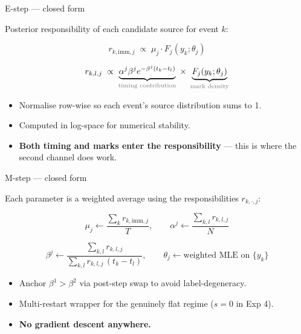 \documentclass[aspectratio=169,11pt]{beamer}
\begin{document}
\begin{frame}{E-step --- closed form}
  \vspace{0.6cm}

  Posterior responsibility of each candidate source for event $k$:

  \vspace{0.3cm}

  $$r_{k,\mathrm{imm},j} \;\propto\; \mu_j \cdot F_j(y_k;\theta_j)$$

  \vspace{0.2cm}

  $$r_{k,l,j} \;\propto\; \underbrace{\alpha^j\beta^j e^{-\beta^j(t_k - t_l)}}_{\textcolor{soft}{\text{timing contribution}}}
                          \;\times\; \underbrace{F_j(y_k;\theta_j)}_{\textcolor{soft}{\text{mark density}}}$$

  \vspace{0.5cm}

  \begin{itemize}
    \item Normalise row-wise so each event's source distribution sums to 1.
    \item Computed in log-space for numerical stability.
    \item \textbf{Both timing and marks enter the responsibility} --- this is where the second channel does work.
  \end{itemize}
\end{frame}

\begin{frame}{M-step --- closed form}
  \vspace{0.4cm}

  Each parameter is a weighted average using the responsibilities $r_{k,\cdot,j}$:

  \vspace{0.2cm}

  $$\mu_j \leftarrow \frac{\sum_k r_{k,\mathrm{imm},j}}{T}, \qquad
    \alpha^j \leftarrow \frac{\sum_{k,l} r_{k,l,j}}{N}$$

  $$\beta^j \leftarrow \frac{\sum_{k,l} r_{k,l,j}}{\sum_{k,l} r_{k,l,j}\,(t_k - t_l)}, \qquad
    \theta_j \leftarrow \text{weighted MLE on } \{y_k\}$$

  \vspace{0.5cm}

  \begin{itemize}
    \item Anchor $\beta^1 > \beta^2$ via post-step swap to avoid label-degeneracy.
    \item Multi-restart wrapper for the genuinely flat regime ($s = 0$ in Exp 4).
    \item \textbf{No gradient descent anywhere.}
  \end{itemize}
\end{frame}
\end{document}
